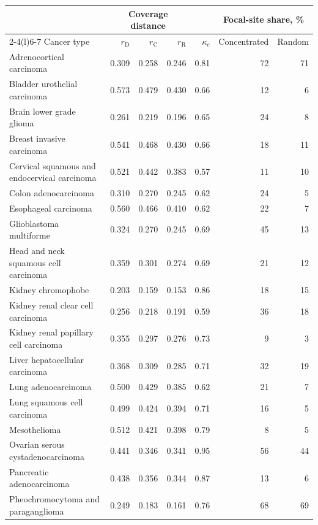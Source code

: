 \begin{table}[htbp]
\centering
\footnotesize
\renewcommand{\arraystretch}{1.1}
\begin{tabular}{@{}lrrrrrr@{}}
\toprule
 & \multicolumn{3}{c}{Coverage distance} & & \multicolumn{2}{c}{Focal-site share, \%} \\
\cmidrule(lr){2-4}\cmidrule(l){6-7}
Cancer type & $r_{\mathrm D}$ & $r_{\mathrm C}$ & $r_{\mathrm R}$ & $\kappa_c$ & Concentrated & Random \\
\midrule
Adrenocortical carcinoma & 0.309 & 0.258 & 0.246 & 0.81 & 72 & 71 \\
Bladder urothelial carcinoma & 0.573 & 0.479 & 0.430 & 0.66 & 12 & 6 \\
Brain lower grade glioma & 0.261 & 0.219 & 0.196 & 0.65 & 24 & 8 \\
Breast invasive carcinoma & 0.541 & 0.468 & 0.430 & 0.66 & 18 & 11 \\
Cervical squamous and endocervical carcinoma & 0.521 & 0.442 & 0.383 & 0.57 & 11 & 10 \\
Colon adenocarcinoma & 0.310 & 0.270 & 0.245 & 0.62 & 24 & 5 \\
Esophageal carcinoma & 0.560 & 0.466 & 0.410 & 0.62 & 22 & 7 \\
Glioblastoma multiforme & 0.324 & 0.270 & 0.245 & 0.69 & 45 & 13 \\
Head and neck squamous cell carcinoma & 0.359 & 0.301 & 0.274 & 0.69 & 21 & 12 \\
Kidney chromophobe & 0.203 & 0.159 & 0.153 & 0.86 & 18 & 15 \\
Kidney renal clear cell carcinoma & 0.256 & 0.218 & 0.191 & 0.59 & 36 & 18 \\
Kidney renal papillary cell carcinoma & 0.355 & 0.297 & 0.276 & 0.73 & 9 & 3 \\
Liver hepatocellular carcinoma & 0.368 & 0.309 & 0.285 & 0.71 & 32 & 19 \\
Lung adenocarcinoma & 0.500 & 0.429 & 0.385 & 0.62 & 21 & 7 \\
Lung squamous cell carcinoma & 0.499 & 0.424 & 0.394 & 0.71 & 16 & 5 \\
Mesothelioma & 0.512 & 0.421 & 0.398 & 0.79 & 8 & 5 \\
Ovarian serous cystadenocarcinoma & 0.441 & 0.346 & 0.341 & 0.95 & 56 & 44 \\
Pancreatic adenocarcinoma & 0.438 & 0.356 & 0.344 & 0.87 & 13 & 6 \\
Pheochromocytoma and paraganglioma & 0.249 & 0.183 & 0.161 & 0.76 & 68 & 69 \\

\end{tabular}
\end{table}
